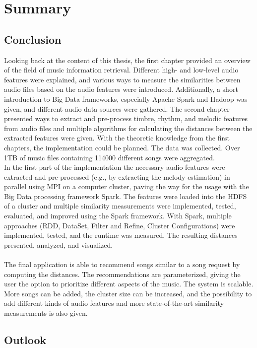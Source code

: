 \chapter{Summary}

\section{Conclusion}

Looking back at the content of this thesis, the first chapter provided an overview of the field of music information retrieval. Different high- and low-level audio features were explained, and various ways to measure the similarities between audio files based on the audio features were introduced. Additionally, a short introduction to Big Data frameworks, especially Apache Spark and Hadoop was given, and different audio data sources were gathered. The second chapter presented ways to extract and pre-process timbre, rhythm, and melodic features from audio files and multiple algorithms for calculating the distances between the extracted features were given. With the theoretic knowledge from the first chapters, the implementation could be planned. The data was collected. Over 1TB of music files containing 114000 different songs were aggregated.\\ 
In the first part of the implementation the necessary audio features were extracted and pre-processed (e.g., by extracting the melody estimation) in parallel using MPI on a computer cluster, paving the way for the usage with the Big Data processing framework Spark.
The features were loaded into the HDFS of a cluster and multiple similarity measurements were implemented, tested, evaluated, and improved using the Spark framework. With Spark, multiple approaches (RDD, DataSet, Filter and Refine, Cluster Configurations) were implemented, tested, and the runtime was measured. The resulting distances presented, analyzed, and visualized.\\
\ \\
The final application is able to recommend songs similar to a song request by computing the distances. The recommendations are parameterized, giving the user the option to prioritize different aspects of the music. The system is scalable. More songs can be added, the cluster size can be increased, and the possibility to add different kinds of audio features and more state-of-the-art similarity measurements is also given. 

\section{Outlook}

